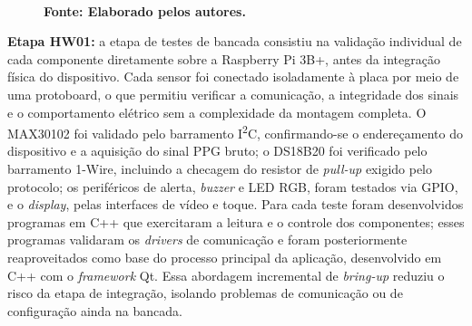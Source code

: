 \begin{figure}[ht]
\\
	\textbf{\footnotesize Fonte: Elaborado pelos autores.}
\end{figure}

\textbf{Etapa HW01:} a etapa de testes de bancada consistiu na validação individual de cada componente diretamente sobre a Raspberry Pi 3B+, antes da integração física do dispositivo. Cada sensor foi conectado isoladamente à placa por meio de uma protoboard, o que permitiu verificar a comunicação, a integridade dos sinais e o comportamento elétrico sem a complexidade da montagem completa. O MAX30102 foi validado pelo barramento I\textsuperscript{2}C, confirmando-se o endereçamento do dispositivo e a aquisição do sinal PPG bruto; o DS18B20 foi verificado pelo barramento 1-Wire, incluindo a checagem do resistor de \textit{pull-up} exigido pelo protocolo; os periféricos de alerta, \textit{buzzer} e LED RGB, foram testados via GPIO, e o \textit{display}, pelas interfaces de vídeo e toque. Para cada teste foram desenvolvidos programas em C++ que exercitaram a leitura e o controle dos componentes; esses programas validaram os \textit{drivers} de comunicação e foram posteriormente reaproveitados como base do processo principal da aplicação, desenvolvido em C++ com o \textit{framework} Qt. Essa abordagem incremental de \textit{bring-up} reduziu o risco da etapa de integração, isolando problemas de comunicação ou de configuração ainda na bancada.

